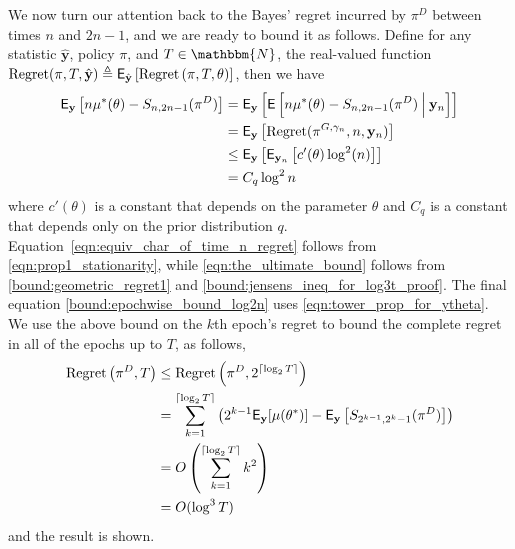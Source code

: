 \begin{myproof}[Proof.]
	We now turn our attention back to the Bayes' regret incurred by $\pi^D$ between times $n$ and $2n-1$, and we are ready to bound it as follows. Define for any statistic $\hat{ \mathbf y}$, policy $\pi$, and $T \in \mathbbm{N}$, the real-valued function $\text{Regret}(\pi, T, \hat {\mathbf{y}}) \defeq \E_{\hat{\mathbf{y}}}\left[\Regret{\pi, T, \theta}\right]$, then we have
	\begin{align}
		\E_{\mathbf y} \left[n \mu^*(\theta) - S_{n,2n-1}(\pi^D)\right] & = \E_{\mathbf y} \left[\E\left[n \mu^*(\theta) - S_{n,2n-1}(\pi^D) \given[\Big] {\mathbf y_n} \right]\right] \nonumber \\
		& = \E_{\mathbf y} \left[\text{Regret}(\pi^{G,\gamma_n}, n,  {\mathbf{y}_n}) \right] \label{eqn:equiv_char_of_time_n_regret} \\
		& \le \E_{\mathbf y} \left[\E_{\mathbf y_n}\left[  c'(\theta)  \log^2 (n) \right] \right]\label{eqn:the_ultimate_bound}  \\
		& = C_q \log^2n  \label{bound:epochwise_bound_log2n}
	\end{align}
	where $c'(\theta)$ is a constant that depends on the parameter $\theta$ and $C_q$ is a constant that depends only on the prior distribution $q$. Equation~\eqref{eqn:equiv_char_of_time_n_regret} follows from \eqref{eqn:prop1_stationarity}, while \eqref{eqn:the_ultimate_bound} follows from \eqref{bound:geometric_regret1} and \eqref{bound:jensens_ineq_for_log3t_proof}. The final equation \eqref{bound:epochwise_bound_log2n} uses \eqref{eqn:tower_prop_for_ytheta}. We use the above bound on the $k$th epoch's regret to bound the complete regret in all of the epochs up to $T$, as follows,
	\begin{align*}
	\Regret{\pi^D, T} & \le \Regret{\pi^D, 2^{\ceil{\log_2 T}}}\\
	& = \sum_{k=1}^{\ceil{\log_2 T}}\left(2^{k-1}\E_{\mathbf{y}}[\mu(\theta^*)] - \E_{\mathbf y}\left[ S_{2^{k-1}, 2^{k}-1}(\pi^D)\right]\right) \nonumber \\
	& =  O\left(\sum_{k=1}^{\ceil{\log_2 T}} k^2 \right)\label{eq:order_optimal_bayes} \\
	& = O(\log^3 T) \nonumber
	\end{align*}
	and the result is shown.
\end{myproof}

